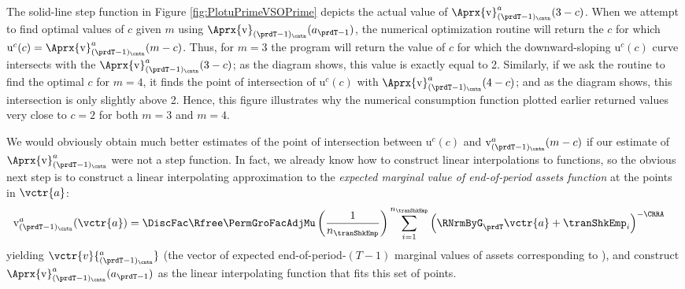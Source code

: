 \documentclass[titlepage, headings=optiontotocandhead]{econtex}
\begin{document}
The solid-line step function in Figure \ref{fig:PlotuPrimeVSOPrime} depicts the actual value of
$\Aprx{\mathrm{v}}_{(\prdT-1)_\cntn}^{a}(3-c)$.  When we attempt to find optimal values of
$c$ given $m$ using $\Aprx{\mathrm{v}}_{(\prdT-1)_\cntn}(a_{\prdT-1})$, the numerical optimization routine will
return the $c$ for which
$\mathrm{u}^{c}(c) = \Aprx{\mathrm{v}}^{a}_{(\prdT-1)_\cntn}(m-c)$.  Thus, for
$m=3$ the program will return the value of $c$ for which the downward-sloping
$\mathrm{u}^{c}(c)$ curve intersects with the
$\Aprx{\mathrm{v}}_{(\prdT-1)_\cntn}^{a}(3-c)$; as the diagram shows, this value is exactly equal to 2.
Similarly, if we ask the routine to find the optimal $c$ for $m=4$, it finds the point of
intersection of $\mathrm{u}^{c}(c)$ with $\Aprx{\mathrm{v}}_{(\prdT-1)_\cntn}^{a}(4-c)$; and as the diagram shows, this
intersection is only slightly above 2.  Hence, this figure illustrates why the numerical consumption
function plotted earlier returned values very close to $c=2$ for both $m=3$ and $m=4$.

We would obviously obtain much better estimates of the point of intersection between $\mathrm{u}^{c}(c)$ and $\mathrm{v}_{(\prdT-1)_\cntn}^{a}(m-c)$ if our estimate of $\Aprx{\mathrm{v}}^{a}_{(\prdT-1)_\cntn}$ were not a step function.  In fact, we already know how to construct linear interpolations to functions, so the obvious next step is to construct a linear interpolating approximation to the \textit{expected marginal value of end-of-period assets function} at the points in $\vctr{a}$:
\begin{equation}\begin{gathered}\begin{aligned}
      \mathrm{v}_{(\prdT-1)_\cntn}^{a}(\vctr{a})  & =  \DiscFac \Rfree \PermGroFacAdjMu \left(\frac{1}{n_{\tranShkEmp}}\right) \sum_{i=1}^{n_{\tranShkEmp}} \left(\RNrmByG_{\prdT} \vctr{a} + \tranShkEmp_{i}\right)^{-\CRRA} \label{eq:vEndPrimeTm1}
    \end{aligned}\end{gathered}\end{equation}
yielding $\vctr{v}{^{a}_{(\prdT-1)_\cntn}}$ (the vector of expected end-of-period-$(T-1)$ marginal values of assets corresponding to ),  %
and construct
$\Aprx{\mathrm{v}}_{(\prdT-1)_\cntn}^{a}(a_{\prdT-1})$ as the linear
interpolating function that fits this set of points.
\end{document}
